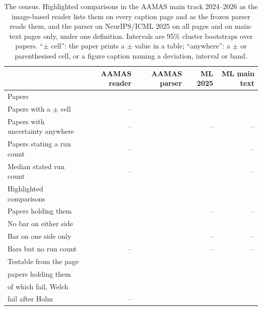 \documentclass[sigconf,anonymous]{aamas}
\begin{document}
\begin{table}[t]
\caption{The census. Highlighted comparisons in the AAMAS main track
2024--2026 as the image-based reader lists them on every caption page and
as the frozen parser reads them, and the parser on NeurIPS/ICML 2025 on all
pages and on main-text pages only, under one definition. Intervals are 95\%
cluster bootstraps over papers. ``$\pm$ cell'': the paper prints a $\pm$
value in a table; ``anywhere'': a $\pm$ or parenthesised cell, or a figure
caption naming a deviation, interval or band.}
\label{tab:census}
\footnotesize
\setlength{\tabcolsep}{2pt}
\begin{tabular}{@{}lrrrr@{}}
\toprule
 & AAMAS reader & AAMAS parser & ML 2025 & ML main text \\
\midrule
Papers & \nAPapers{} & \nAPapers{} & \nMlPapers{} & \nMlPapers{} \\
Papers with a $\pm$ cell & -- & \nAPctPapersErr{} & \nMlPctPapersErr{} & \nMlMainPapersErr{} \\
Papers with uncertainty anywhere & -- & \nUaAnywhere{} & -- & -- \\
Papers stating a run count & -- & \nAPctPapersRuns{} & \nMlPctPapersRuns{} & -- \\
Median stated run count & -- & \nAMedianRuns{} & \nMlMedianRuns{} & -- \\
Highlighted comparisons & \nCzGroups{} & \nAComparisons{} & \nMlComparisons{} & \nMlMainComparisons{} \\
Papers holding them & \nCzPapersWithGroups{} & \nClaimPapers{} & -- & -- \\
No bar on either side & \nCzNeitherCi{} & \nAPctNeitherCi{} & \nMlPctNeitherCi{} & \nMlMainNeither{} \\
Bar on one side only & \nCzOneSide{} & \nAPctOneSide{} & -- & -- \\
Bars but no run count & -- & \nAPctNoN{} & -- & -- \\
Testable from the page & \nCzTestableCi{} & \nAPctTestableCi{} & \nMlPctTestableCi{} & \nMlMainTestable{} \\
\quad papers holding them & \nCzReaderFailPapers{} & \nAPapersTestable{} & \nMlTestablePapers{} & \nMlMainTestablePapers{} \\
\quad of which fail, Welch & \nCzReaderFail{} & \nAPctFailCi{} & \nMlPctFailCi{} & \nMlMainFail{} \\
\quad fail after Holm & -- & \nAPctFailHolmCi{} & \nMlPctFailHolmCi{} & \nMlMainFailHolm{} \\
\bottomrule
\end{tabular}
\end{table}
\end{document}
